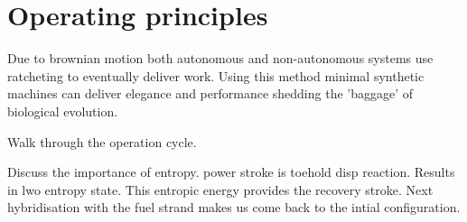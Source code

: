 \section{Operating principles}


Due to brownian motion both autonomous and non-autonomous systems use ratcheting to
eventually deliver work. Using this method minimal synthetic machines can deliver
elegance and performance shedding the 'baggage' of biological evolution.

Walk through the operation cycle.

Discuss the importance of entropy. power stroke is toehold disp reaction. Results in lwo
entropy state. This entropic energy provides the recovery stroke. Next hybridisation with
the fuel strand makes us come back to the intial configuration.


